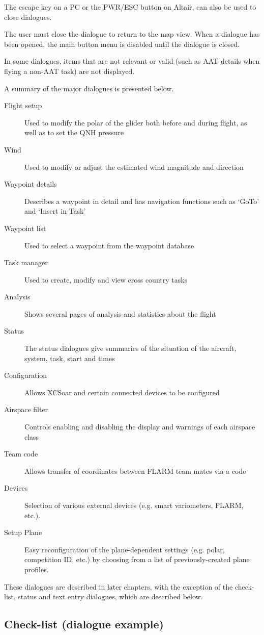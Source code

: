 The escape key on a PC or the PWR/ESC button on Altair, can also be used to
close dialogues.

The user must close the dialogue to return to the map view. When a dialogue
has been opened, the main button menu is disabled until the dialogue is closed.

In some dialogues, items that are not relevant or valid (such as AAT details when
flying a non-AAT task) are not displayed.

A summary of the major dialogues is presented below.
\begin{description}
\item[Flight setup] Used to modify the polar of the glider both before and
during flight, as well as to set the QNH pressure
\item[Wind] Used to modify or adjust the estimated wind magnitude and direction
\item[Waypoint details] Describes a waypoint in detail and has navigation
functions such as `GoTo' and `Insert in Task'
\item[Waypoint list] Used to select a waypoint from the waypoint database
\item[Task manager] Used to create, modify and view cross country tasks
\item[Analysis] Shows several pages of analysis and statistics about the flight
\item[Status] The status dialogues give summaries of the situation of the
aircraft, system, task, start and times
\item[Configuration] Allows XCSoar and certain connected devices to be
configured
\item[Airspace filter] Controls enabling and disabling the display and warnings
of each airspace class
\item[Team code] Allows transfer of coordinates between FLARM team mates via a
  code
\item[Devices]  Selection of various external devices (e.g. smart variometers,
  FLARM, etc.).
\item[Setup Plane]  Easy reconfiguration of the plane-dependent settings (e.g.
  polar, competition ID, etc.) by choosing from a list of previously-created
  plane profiles.
\end{description}

These dialogues are described in later chapters, with the exception of the
check-list, status and text entry dialogues, which are described below.


\subsection*{Check-list (dialogue example)}\label{sec:checklist}

